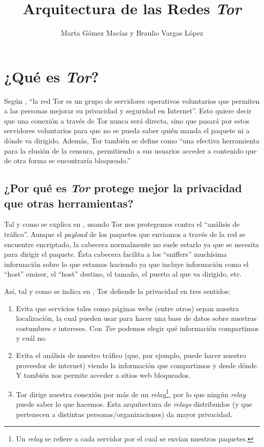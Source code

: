 \documentclass[10pt,a4paper,spanish]{article}
\title{\Huge Arquitectura de las Redes \textit{Tor}}
\author{\Large Marta Gómez Macías y Braulio Vargas López}
\begin{document}
\renewcommand{\tablename}{Tabla}
\maketitle

\section{¿Qué es \textit{Tor}?}
Según \cite{deftor}, ``la red Tor es un grupo de servidores operativos voluntarios que permiten a las personas mejorar su privacidad y seguridad en Internet''. Esto quiere decir que una conexión a través de Tor nunca será directa, sino que pasará por estos servidores voluntarios para que no se pueda saber quién manda el paquete ni a dónde va dirigido. Además, Tor también se define como ``una efectiva herramienta para la elusión de la censura, permitiendo a sus usuarios acceder a contenido que de otra forma se encontraría bloqueado.''

\subsection{¿Por qué es \textit{Tor} protege mejor la privacidad que otras herramientas?}
Tal y como se explica en \cite{deftor}, usando Tor nos protegemos contra el ``análisis de tráfico''. Aunque el \textit{payload} de los paquetes que enviamos a través de la red se encuentre encriptado, la cabecera normalmente no suele estarlo ya que se necesita para dirigir el paquete. Ésta cabecera facilita a los ``sniffers'' muchísima información sobre lo que estamos haciendo ya que incluye información como el ``host'' emisor, el ``host'' destino, el tamaño, el puerto al que va dirigido, etc.

Así, tal y como se indica en \cite{protectionstor}, Tor defiende la privacidad en tres sentidos:
\begin{enumerate}[$\bullet$]
    \item Evita que servicios tales como páginas webs (entre otros) sepan nuestra localización, la cual pueden usar para hacer una base de datos sobre nuestras costumbres e intereses. Con \textit{Tor} podemos elegir qué información compartimos y cuál no.
    \item Evita el análisis de nuestro tráfico (que, por ejemplo, puede hacer nuestro proveedor de internet) viendo la información que compartimos y desde dónde. Y también nos permite acceder a sitios web bloqueados.
    \item Tor dirige nuestra conexión por más de un \textit{relay}\footnote{Un \textit{relay} se refiere a cada servidor por el cual se envían nuestros paquetes.}, por lo que ningún \textit{relay} puede saber lo que hacemos. Esta arquitectura de \textit{relays} distribuidos (y que pertenecen a distintas personas/organizaciones) da mayor privacidad.
\end{enumerate}
\end{document}
